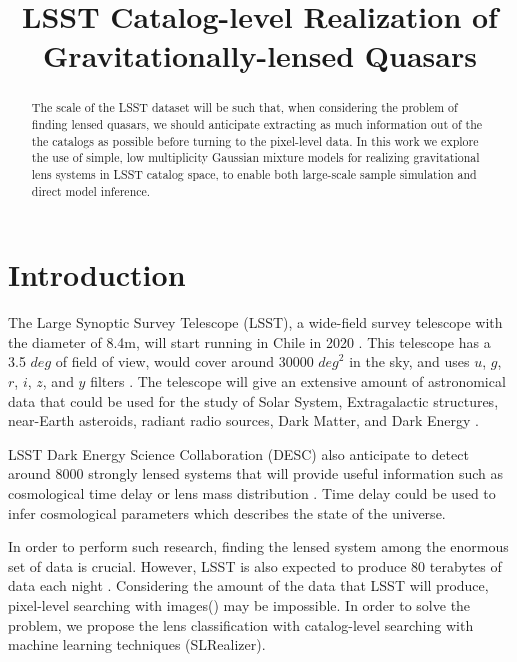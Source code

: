 \documentclass[\docopts]{\docclass}
\begin{document}
\title{ LSST Catalog-level Realization of Gravitationally-lensed Quasars }

\maketitlepre

\begin{abstract}

The scale of the LSST dataset will be such that, when considering the
problem of finding lensed quasars, we should anticipate extracting as
much information out of the the catalogs as possible before turning to
the pixel-level data. In this work we explore the use of simple, low
multiplicity Gaussian mixture models for realizing gravitational lens
systems in LSST catalog space, to enable both large-scale sample
simulation and direct model inference.

\end{abstract}


\maketitlepost


\section{Introduction}
\label{sec:intro}

The Large Synoptic Survey Telescope (LSST), a wide-field survey telescope with the diameter
of 8.4m, will start running in Chile in 2020 \cite{LSST_overall}. This
telescope has a 3.5 $deg$ of field of view, would cover around 30000
$\textit{deg}^2$ in the sky, and uses $u$, $g$, $r$, $i$, $z$, and $y$
filters \cite{LSSTScienceBookv2}. The telescope will give an extensive
amount of astronomical data that could be used for the study of Solar
System, Extragalactic structures, near-Earth asteroids, radiant radio
sources, Dark Matter, and Dark Energy \cite{LSSTScienceBookv2}.

LSST Dark Energy Science Collaboration (DESC) also anticipate to detect
around 8000 strongly lensed systems that will provide useful information
such as cosmological time delay or lens mass distribution
\cite{DESC_overall} \cite{TimeDelayOverall} \cite{Twinkles}. Time delay
could be used to infer cosmological parameters \cite{Treu2010} which
describes the state of the universe.

In order to perform such research, finding the lensed system among the
enormous set of data is crucial. However, LSST is also expected to
produce 80 terabytes of data each night \cite{LSSTScienceBookv2}.
Considering the amount of the data that LSST will produce, pixel-level
searching with images(\cite{RINGFINDER}) may be impossible. In order to
solve the problem, we propose the lens classification with catalog-level
searching with machine learning techniques (SLRealizer).
\end{document}
